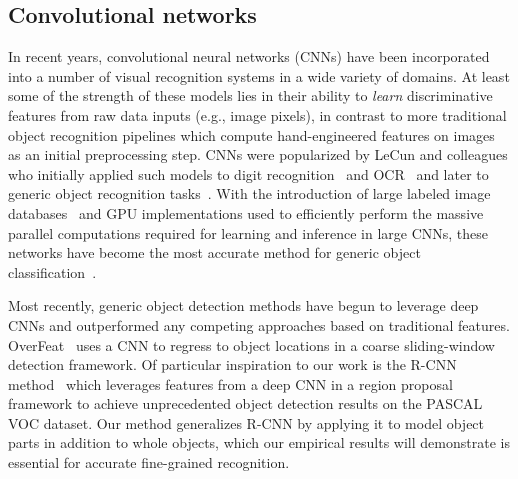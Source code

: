 


\subsection{Convolutional networks}
In recent years, convolutional neural networks (CNNs) have been incorporated into a number of visual recognition systems in a wide variety of domains.
At least some of the strength of these models lies in their ability to \textit{learn} discriminative features from raw data inputs (e.g., image pixels), in contrast to more traditional object recognition pipelines which compute hand-engineered features on images as an initial preprocessing step.
CNNs were popularized by LeCun and colleagues who initially applied such models to digit recognition~\cite{Lecun89} and OCR~\cite{Lecun98OCR} and later to generic object recognition tasks~\cite{jarrett-iccv2009}.
With the introduction of large labeled image databases~\cite{ILSVRC} and GPU implementations used to efficiently perform the massive parallel computations required for learning and inference in large CNNs,
these networks have become the most accurate method for generic object classification~\cite{krizhevsky}.

Most recently, generic object detection methods have begun to leverage deep CNNs and outperformed any competing approaches based on traditional features.
OverFeat~\cite{overfeat} uses a CNN to regress to object locations in a coarse sliding-window detection framework.
Of particular inspiration to our work is the R-CNN method~\cite{rcnn} which leverages features from a deep CNN in a region proposal framework to achieve unprecedented object detection results on the PASCAL VOC dataset.
Our method generalizes R-CNN by applying it to model object parts in addition to whole objects, which our empirical results will demonstrate is essential for accurate fine-grained recognition.

